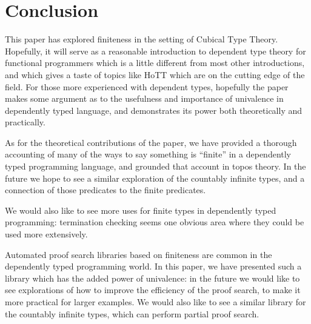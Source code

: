 \section{Conclusion}
This paper has explored finiteness in the setting of Cubical Type Theory.
Hopefully, it will serve as a reasonable introduction to dependent type theory
for functional programmers which is a little different from most other
introductions, and which gives a taste of topics like HoTT which are on the
cutting edge of the field.
For those more experienced with dependent types, hopefully the paper makes some
argument as to the usefulness and importance of univalence in dependently typed
language, and demonstrates its power both theoretically and practically.

As for the theoretical contributions of the paper, we have provided a thorough
accounting of many of the ways to say something is ``finite'' in a
dependently typed programming language, and grounded that account in topos
theory.
In the future we hope to see a similar exploration of the countably infinite
types, and a connection of those predicates to the finite predicates.

We would also like to see more uses for finite types in dependently typed
programming: termination checking seems one obvious area where they could be
used more extensively.

Automated proof search libraries based on finiteness are common in the
dependently typed programming world.
In this paper, we have presented such a library which has the added power of
univalence: in the future we would like to see explorations of how to improve
the efficiency of the proof search, to make it more practical for larger
examples.
We would also like to see a similar library for the countably infinite types,
which can perform partial proof search.

